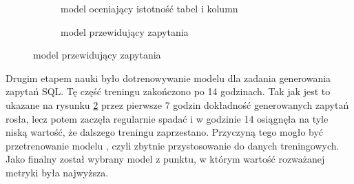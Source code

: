 \begin{figure}[ht!]
\centering
\begin{subfigure}{0.49\textwidth}
    \caption{model oceniający istotność tabel i kolumn}
    \label{plot:resdsql-classifier-accuracy}
\end{subfigure}
\hfill
\begin{subfigure}{0.49\textwidth}
    \caption{model przewidujący zapytania}
    \label{plot:resdsql-t5-accuracy}
\end{subfigure}
\label{plot:resdsql-accuracy}
\end{figure}

Drugim etapem nauki było dotrenowywanie modelu  dla zadania generowania zapytań SQL. Tę część treningu zakończono po 14 godzinach. Tak jak jest to ukazane na rysunku \ref{plot:resdsql-t5-accuracy} przez pierwsze 7 godzin dokładność generowanych zapytań rosła, lecz potem zaczęła regularnie spadać i w godzinie 14 osiągnęła na tyle niską wartość, że dalszego treningu zaprzestano. Przyczyną tego mogło być przetrenowanie modelu , czyli zbytnie przystosowanie do danych treningowych. Jako finalny został wybrany model z punktu, w którym wartość rozważanej metryki była najwyższa.

